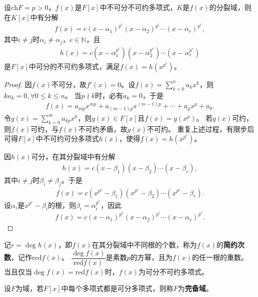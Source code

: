\documentclass[../../main.tex]{subfiles}%
\begin{document}
\begin{theorem}
设$\mathrm{ch}F=p>0$，$f(x)$是$F[x]$中不可分不可约多项式，$K$是$f(x)$的分裂域，则在$K[x]$中有分解
\begin{align*}
f(x)=c(x-\alpha_1)^{p^e}(x-\alpha_2)^{p^e}\cdots(x-\alpha_r)^{p^e},
\end{align*}
其中$i\neq j$时$\alpha_i\neq\alpha_j$，$e\in\mathbb{N}$，且
\begin{align*}
h(x)=c(x-\alpha_1^{p^e})(x-\alpha_2^{p^e})\cdots(x-\alpha_r^{p^e})
\end{align*}
是$F[x]$中可分的不可约多项式，满足$f(x)=h(x^{p^e})$。
\end{theorem}

\begin{proof}
因$f(x)$不可分，故$f'(x)=0$。设$f(x)=\sum\limits_{k=0}^n a_kx^k$，则$ka_k=0,\forall 0\leqslant k\leqslant n$。
当$p\nmid k$时，必有$a_k=0$，于是
\begin{align*}
f(x)=a_{mp}x^{mp}+a_{(m-1)p}x^{(m-1)p}+\cdots+a_px^p+a_0.
\end{align*}
令$g(x)=\sum\limits_{k=0}^m a_{kp}x^k$，则$g(x)\in F[x]$且$f(x)=g(x^p)$。
若$g(x)$可约，则$f(x)$可约，与$f(x)$不可约矛盾，故$g(x)$不可约。
重复上述过程，有限步后可得$F[x]$中不可约可分多项式$h(x)$，使得$f(x)=h(x^{p^e})$。

因$h(x)$可分，在其分裂域中有分解
\begin{align*}
h(x)=c(x-\beta_1)(x-\beta_2)\cdots(x-\beta_r),
\end{align*}
其中$i\neq j$时$\beta_i\neq\beta_j$。于是
\begin{align*}
f(x)=c(x^{p^e}-\beta_1)(x^{p^e}-\beta_2)\cdots(x^{p^e}-\beta_r).
\end{align*}
设$\alpha_i$是$x^{p^e}-\beta_i$的根，则$\beta_i=\alpha_i^{p^e}$，因此
\begin{align*}
f(x)=c(x-\alpha_1)^{p^e}(x-\alpha_2)^{p^e}\cdots(x-\alpha_r)^{p^e}.
\end{align*}
\end{proof}

\begin{remark}
记$r=\deg h(x)$，即$f(x)$在其分裂域中不同根的个数，称为$f(x)$的\textbf{简约次数}，记作$\mathrm{red}f(x)$。
$\dfrac{\deg f(x)}{\mathrm{red}f(x)}$是素数$p$的方幂，且为$f(x)$的任一根的重数。
当且仅当$\deg f(x)=\mathrm{red}f(x)$时，$f(x)$为可分不可约多项式。
\end{remark}

\begin{definition}
设$F$为域，若$F[x]$中每个多项式都是可分多项式，则称$F$为\textbf{完备域}。
\end{definition}
\end{document}
